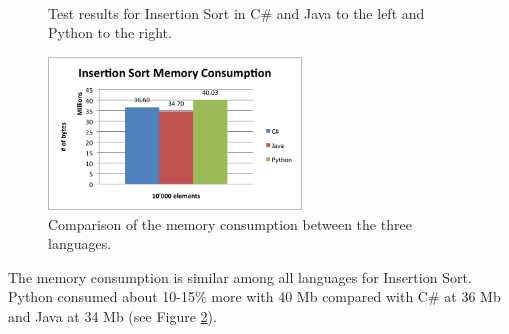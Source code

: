 \begin{figure}[h]
	\centering
	\mbox{
	}
	\caption{Test results for Insertion Sort in C\# and Java to the left and Python to the right.}
	\label{fig:insertion_sort_graphs}
\end{figure} 

\begin{figure}[h]
	\centering
	\includegraphics[width=0.6\textwidth]{chapters/media/insertion_sort_memory.png}
	\caption{Comparison of the memory consumption between the three languages.}
	\label{fig:insertion_sort_memory}
\end{figure}

The memory consumption is similar among all languages for Insertion Sort. Python consumed about 10-15\% more with 40 Mb compared with C\# at 36 Mb and Java at 34 Mb (see Figure \ref{fig:insertion_sort_memory}).




















